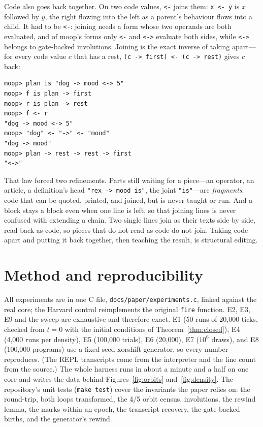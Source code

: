 \documentclass[11pt]{article}
\theoremstyle{definition}
\theoremstyle{remark}
\newcommand{\moop}{\textsf{moop}}
\newcommand{\code}[1]{\texttt{#1}}
\begin{document}
Code also goes back together. On two code values, \code{<-} joins them:
\code{x <- y} is $x$ followed by $y$, the right flowing into the left as
a parent's behaviour flows into a child. It had to be \code{<-}: joining
needs a form whose two operands are both evaluated, and of \moop{}'s
forms only \code{<-} and \code{<->} evaluate both sides, while
\code{<->} belongs to gate-backed involutions. Joining is the exact
inverse of taking apart---for every code value $c$ that has a rest,
\code{(c -> first) <- (c -> rest)} gives $c$ back:
\begin{Verbatim}[fontsize=\small,xleftmargin=2em]
moop> plan is "dog -> mood <-> 5"
moop> f is plan -> first
moop> r is plan -> rest
moop> f <- r
"dog -> mood <-> 5"
moop> "dog" <- "->" <- "mood"
"dog -> mood"
moop> plan -> rest -> rest -> first
"<->"
\end{Verbatim}
That law forced two refinements. Parts still waiting for a piece---an
operator, an article, a definition's head \code{"rex -> mood is"}, the
joint \code{"is"}---are \emph{fragments}: code that can be quoted,
printed, and joined, but is never taught or run. And a block stays a
block even when one line is left, so that joining lines is never
confused with extending a chain. Two single lines join as their texts
side by side, read back as code, so pieces that do not read as code do
not join. Taking code apart and putting it back together, then teaching
the result, is structural editing.

\section{Method and reproducibility}
\label{sec:method}

All experiments are in one C file, \code{docs/paper/experiments.c},
linked against the real core; the Harvard control reimplements the
original \code{fire} function. E2, E3, E9 and the sweep are
exhaustive and therefore exact. E1 (50 runs of 20,000 ticks, checked
from $t=0$ with the initial conditions of Theorem~\ref{thm:closed}), E4 (4,000 runs per
density), E5 (100,000 trials), E6 (20,000), E7 ($10^6$ draws), and E8
(100,000 programs) use a fixed-seed xorshift generator, so every number
reproduces. (The REPL transcripts come from the interpreter and the line
count from the source.) The whole harness runs in about a minute and a
half on one
core and writes the data behind Figures~\ref{fig:orbits}
and~\ref{fig:density}. The repository's unit tests (\code{make test})
cover the invariants the paper relies on: the round-trip, both loops
transformed, the 4/5 orbit census, involutions, the rewind lemma, the
marks within an epoch, the transcript recovery, the gate-backed births,
and the generator's rewind.
\end{document}
